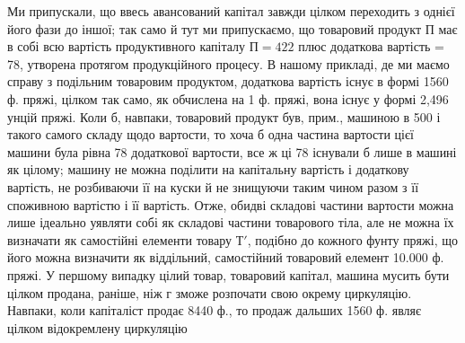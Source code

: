 Ми припускали, що ввесь авансований капітал завжди цілком переходить
з однієї його фази до іншої; так само й тут ми припускаємо, що товаровий
продукт $П$ має в собі всю вартість продуктивного капіталу
$П = 422$ плюс додаткова вартість = 78, утворена
протягом продукційного процесу. В нашому прикладі, де ми маємо справу
з подільним товаровим продуктом, додаткова вартість існує в формі
1560 ф. пряжі, цілком так само, як обчислена на 1 ф. пряжі, вона існує
у формі 2,496 унцій пряжі. Коли б, навпаки, товаровий продукт був, прим., машиною
в 500 і такого самого складу щодо вартости, то хоча б
одна частина вартости цієї машини була рівна 78 додаткової
вартости, все ж ці 78 існували б лише в машині як цілому;
машину не можна поділити на капітальну вартість і додаткову вартість,
не розбиваючи її на куски й не знищуючи таким чином разом з її споживною
вартістю і її вартість. Отже, обидві складові частини вартости
можна лише ідеально уявляти собі як складові частини товарового тіла,
але не можна їх визначати як самостійні елементи товару $Т'$, подібно до
кожного фунту пряжі, що його можна визначити як віддільний, самостійний
товаровий елемент \num{10.000} ф. пряжі. У першому випадку цілий товар, товаровий
капітал, машина мусить бути цілком продана, раніше, ніж г зможе розпочати
свою окрему циркуляцію. Навпаки, коли капіталіст продає 8440 ф.,
то продаж дальших 1560 ф. являє цілком відокремлену циркуляцію
\parbreak{}  %
